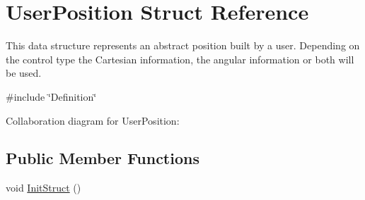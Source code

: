 \hypertarget{struct_user_position}{}\section{User\+Position Struct Reference}
\label{struct_user_position}


This data structure represents an abstract position built by a user. Depending on the control type the Cartesian information, the angular information or both will be used.  




{\ttfamily \#include \char`\"{}Definition\char`\"{}}



Collaboration diagram for User\+Position\+:
\subsection*{Public Member Functions}
\begin{DoxyCompactItemize}
\item 
void \hyperlink{struct_user_position_ad682f9be07fa2307028f86624ded2958}{Init\+Struct} ()
\end{DoxyCompactItemize}
